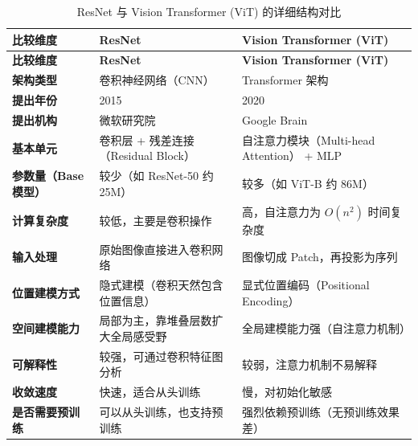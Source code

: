 \documentclass[UTF8]{report}
\theoremstyle{MyLineTheoremStyle} %
\theoremstyle{MyBlockTheoremStyle} %
\theoremstyle{MySubsubsectionStyle} %
\begin{document}
\setlength\LTleft{0pt}   %
\setlength\LTright{0pt}  %
\begin{longtable}{@{}p{}p{}p{}@{}}
\caption{ResNet 与 Vision Transformer (ViT) 的详细结构对比} \\ 
\toprule
\textbf{比较维度} & \textbf{ResNet} & \textbf{Vision Transformer (ViT)} \\
\midrule
\endfirsthead

\toprule
\textbf{比较维度} & \textbf{ResNet} & \textbf{Vision Transformer (ViT)} \\
\midrule
\endhead

\textbf{架构类型}           & 卷积神经网络（CNN）                           & Transformer 架构                              \\
\textbf{提出年份}           & 2015                                         & 2020                                        \\
\textbf{提出机构}           & 微软研究院                                    & Google Brain                                \\
\textbf{基本单元}           & 卷积层 + 残差连接（Residual Block）            & 自注意力模块（Multi-head Attention） + MLP   \\
\textbf{参数量（Base模型）} & 较少（如 ResNet-50 约 25M）                   & 较多（如 ViT-B 约 86M）                     \\
\textbf{计算复杂度}         & 较低，主要是卷积操作                           & 高，自注意力为 \(O(n^2)\) 时间复杂度         \\
\textbf{输入处理}           & 原始图像直接进入卷积网络                       & 图像切成 Patch，再投影为序列                 \\
\textbf{位置建模方式}       & 隐式建模（卷积天然包含位置信息）               & 显式位置编码（Positional Encoding）         \\
\textbf{空间建模能力}       & 局部为主，靠堆叠层数扩大全局感受野             & 全局建模能力强（自注意力机制）               \\
\textbf{可解释性}           & 较强，可通过卷积特征图分析                     & 较弱，注意力机制不易解释                     \\
\textbf{收敛速度}           & 快速，适合从头训练                             & 慢，对初始化敏感                             \\
\textbf{是否需要预训练}     & 可以从头训练，也支持预训练                     & 强烈依赖预训练（无预训练效果差）             \\

\end{longtable}
\end{document}
